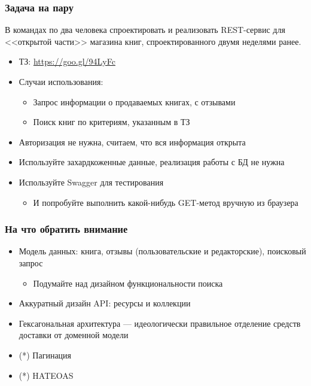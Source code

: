 \documentclass{../mcsslides}
\begin{document}
    
    \begin{frame}[plain]
        \titlepage
    \end{frame}

    \begin{frame}
        \frametitle{Задача на пару}
        В командах по два человека спроектировать и реализовать REST-сервис для <<открытой части>> магазина книг, спроектированного двумя неделями ранее.
        \begin{itemize}
            \item ТЗ: \url{https://goo.gl/94LyFc}
            \item Случаи использования:
            \begin{itemize}
                \item Запрос информации о продаваемых книгах, с отзывами
                \item Поиск книг по критериям, указанным в ТЗ
            \end{itemize}
            \item Авторизация не нужна, считаем, что вся информация открыта
            \item Используйте захардкоженные данные, реализация работы с БД не нужна
            \item Используйте Swagger для тестирования
            \begin{itemize}
                \item И попробуйте выполнить какой-нибудь GET-метод вручную из браузера
            \end{itemize}
        \end{itemize}
    \end{frame}

    \begin{frame}
        \frametitle{На что обратить внимание}
        \begin{itemize}
            \item Модель данных: книга, отзывы (пользовательские и редакторские), поисковый запрос
            \begin{itemize}
                \item Подумайте над дизайном функциональности поиска
            \end{itemize}
            \item Аккуратный дизайн API: ресурсы и коллекции
            \item Гексагональная архитектура --- идеологически правильное отделение средств доставки от доменной модели
            \item (*) Пагинация
            \item (*) HATEOAS
        \end{itemize}
    \end{frame}
\end{document}
